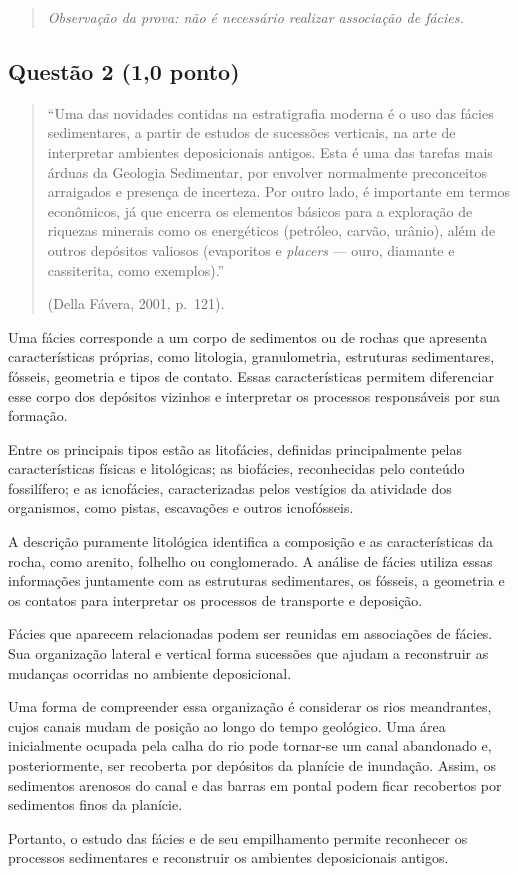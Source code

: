 \begin{quote}
  \textit{Observação da prova: não é necessário realizar associação de fácies.}
\end{quote}

\subsection{Questão 2 (1,0 ponto)}

\begin{quote}
``Uma das novidades contidas na estratigrafia moderna é o uso das fácies
sedimentares, a partir de estudos de sucessões verticais, na arte de interpretar
ambientes deposicionais antigos. Esta é uma das tarefas mais árduas da Geologia
Sedimentar, por envolver normalmente preconceitos arraigados e presença de
incerteza. Por outro lado, é importante em termos econômicos, já que encerra os
elementos básicos para a exploração de riquezas minerais como os energéticos
(petróleo, carvão, urânio), além de outros depósitos valiosos (evaporitos e
\textit{placers} --- ouro, diamante e cassiterita, como exemplos).''

\hfill (Della Fávera, 2001, p.~121).
\end{quote}

Uma fácies corresponde a um corpo de sedimentos ou de rochas que apresenta
características próprias, como litologia, granulometria, estruturas
sedimentares, fósseis, geometria e tipos de contato. Essas características
permitem diferenciar esse corpo dos depósitos vizinhos e interpretar os
processos responsáveis por sua formação.

Entre os principais tipos estão as litofácies, definidas principalmente pelas
características físicas e litológicas; as biofácies, reconhecidas pelo conteúdo
fossilífero; e as icnofácies, caracterizadas pelos vestígios da atividade dos
organismos, como pistas, escavações e outros icnofósseis.

A descrição puramente litológica identifica a composição e as características
da rocha, como arenito, folhelho ou conglomerado. A análise de fácies utiliza
essas informações juntamente com as estruturas sedimentares, os fósseis, a
geometria e os contatos para interpretar os processos de transporte e
deposição.

Fácies que aparecem relacionadas podem ser reunidas em associações de fácies.
Sua organização lateral e vertical forma sucessões que ajudam a reconstruir as
mudanças ocorridas no ambiente deposicional.

Uma forma de compreender essa organização é considerar os rios meandrantes,
cujos canais mudam de posição ao longo do tempo geológico. Uma área
inicialmente ocupada pela calha do rio pode tornar-se um canal abandonado e,
posteriormente, ser recoberta por depósitos da planície de inundação. Assim,
os sedimentos arenosos do canal e das barras em pontal podem ficar recobertos
por sedimentos finos da planície.

Portanto, o estudo das fácies e de seu empilhamento permite reconhecer os
processos sedimentares e reconstruir os ambientes deposicionais antigos.